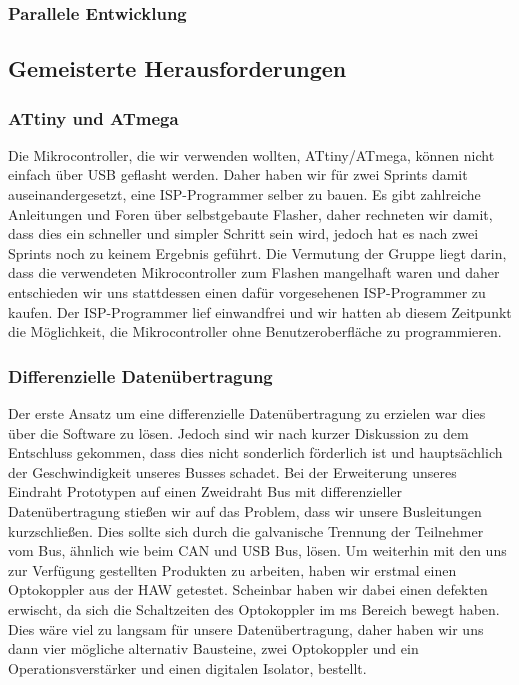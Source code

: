 \subsubsection{Parallele Entwicklung}

\subsection{Gemeisterte Herausforderungen}
\subsubsection{ATtiny und ATmega}
Die Mikrocontroller, die wir verwenden wollten, ATtiny/ATmega, können nicht einfach über USB geflasht werden. Daher haben wir für zwei Sprints damit auseinandergesetzt, eine ISP-Programmer selber zu bauen. Es gibt zahlreiche Anleitungen und Foren über selbstgebaute Flasher, daher rechneten wir damit, dass dies ein schneller und simpler Schritt sein wird, jedoch hat es nach zwei Sprints  noch zu keinem Ergebnis geführt. Die Vermutung der Gruppe liegt darin, dass die verwendeten Mikrocontroller zum Flashen mangelhaft waren und daher entschieden wir uns stattdessen einen dafür vorgesehenen ISP-Programmer zu kaufen. Der ISP-Programmer lief einwandfrei und wir hatten ab diesem Zeitpunkt die Möglichkeit, die Mikrocontroller ohne Benutzeroberfläche zu programmieren.

\subsubsection{Differenzielle Datenübertragung}
Der erste Ansatz um eine differenzielle Datenübertragung zu erzielen war dies über die Software zu lösen. Jedoch sind wir nach kurzer Diskussion zu dem Entschluss gekommen, dass dies nicht sonderlich förderlich ist und hauptsächlich der Geschwindigkeit unseres Busses schadet.
Bei der Erweiterung unseres Eindraht Prototypen auf einen Zweidraht Bus mit differenzieller Datenübertragung stießen wir auf das Problem, dass wir unsere Busleitungen kurzschließen. Dies sollte sich durch die galvanische Trennung der Teilnehmer vom Bus, ähnlich wie beim CAN und USB Bus, lösen.
Um weiterhin mit den uns zur Verfügung gestellten Produkten zu arbeiten, haben wir erstmal einen Optokoppler aus der HAW getestet. Scheinbar haben wir dabei einen defekten erwischt, da sich die Schaltzeiten des Optokoppler im ms Bereich bewegt haben. Dies wäre viel zu langsam für unsere Datenübertragung, daher haben wir uns dann vier mögliche alternativ Bausteine, zwei Optokoppler und ein Operationsverstärker und einen digitalen Isolator, bestellt.
\\

